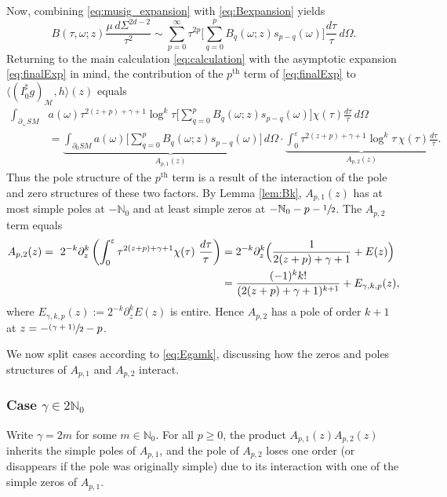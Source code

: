 \documentclass[JEP,XML,SOM,Unicode,NoFloatCountersInSection, NoEqCountersInSection,published]{cedram}
\let\cal\mathcal
\newcommand{\psfrac}[2]{\sfrac{(#1)}{#2}}
\theoremstyle{plain}
\theoremstyle{definition}
\theoremstyle{remark}
\def\Nm{{\mathbb{N}}}
\newcommand{\adj}{I_0^\sharp}
\begin{document}
Now, combining \eqref{eq:musig_expansion} with \eqref{eq:Bexpansion} yields
\begin{equation}
B(\tau,\omega; z) \frac{\mu \, d\Sigma^{2d-2}}{\tau^2} \sim \sum_{p=0}^\infty \tau^{2p}
\biggl[\sum_{q=0}^{p} B_q(\omega; z) s_{p-q}(\omega) \biggr] \frac{d\tau}{\tau}\,d\Omega.
\label{eq:finalExp}
\end{equation}
Returning to the main calculation \eqref{eq:calculation} with the asymptotic expansion \eqref{eq:finalExp} in mind, the contribution of the $p^{\mathrm{th}}$ term of \eqref{eq:finalExp} to $\langle (\adj g)_{\cal M}, h\rangle(z)$ equals
\begin{align*}
\int_{\partial_+ SM} & a(\omega) \tau^{2(z+p)+\gamma+1} \log^k\tau \biggl[\sum_{q=0}^{p} B_q(\omega; z) s_{p-q}(\omega) \biggr]
\chi(\tau) \frac{d\tau}{\tau}\,d\Omega \\
&= \underbrace{\int_{\partial_0 SM} a(\omega) \biggl[\sum_{q=0}^{p} B_q(\omega; z) s_{p-q}(\omega) \biggr]\,d\Omega}_{A_{p,1}(z)} \cdot \underbrace{\int_0^\varepsilon \tau^{2(z+p)+\gamma+1} \log^k \tau \, \chi(\tau) \frac{d\tau}{\tau}}_{A_{p,2}(z)}.
\end{align*}
Thus the pole structure of the $p^{\mathrm{th}}$ term is a result of the interaction of the pole and zero structures of these two factors.
By Lemma \ref{lem:Bk}, $A_{p,1}(z)$ has at most simple poles at $-\Nm_0$ and at least simple zeros at $-\Nm_0 - p - \sfrac{1}{2}$. The $A_{p,2}$ term equals
\begin{align*}
A_{p,2}(z) = \ 2^{-k} \partial_z^k \left(\int_0^\varepsilon \tau^{2(z+p)+\gamma+1} \chi(\tau)\ \frac{d\tau}{\tau} \right) &= 2^{-k} \partial_z^k \Bigl(\frac{1}{2(z+p)+\gamma+1} + E(z) \Bigr) \\
&= \frac{(-1)^k k!}{(2(z+p) + \gamma+1)^{k+1}} + E_{\gamma,k,p}(z),
\end{align*}
where $E_{\gamma,k,p}(z) := 2^{-k} \partial_z^k E(z)$ is entire. Hence $A_{p,2}$ has a pole of order $k+1$ at $z = -\psfrac{\gamma+1}{2}-p$.

We now split cases according to \eqref{eq:Egamk}, discussing how the zeros and poles structures of $A_{p,1}$ and $A_{p,2}$ interact.

\subsubsection*{Case $\gamma\in 2\Nm_0$}
Write $\gamma = 2m$ for some $m\in \Nm_0$. For all $p\ge 0$, the product $A_{p,1}(z) A_{p,2}(z)$ inherits the simple poles of $A_{p,1}$, and the pole of $A_{p,2}$ loses one order (or disappears if the pole was originally simple) due to its interaction with one of the simple zeros of $A_{p,1}$.
\end{document}
